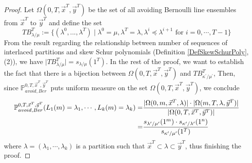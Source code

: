 \begin{proof} Let $\Omega(0,T,\vec{x}^T, \vec{y}^T)$ be the set of all avoiding Bernoulli line ensembles from $\vec{x}^T$ to $\vec{y}^T$ and define the set 
\[TB_{\lambda/\mu}^T:=\{(\lambda^0,...,\lambda^T)\mid \lambda^0=\mu, \lambda^T=\lambda, \lambda^i\preceq\lambda^{i+1}\text{ for }i=0,\cdots,T-1\}\] 
From the result regarding the relationship between number of sequences of interlaced partitions and skew Schur polynomials (Definition \ref{DefSkewSchurPoly}, (2)), we have $\lvert TB_{\lambda/\mu}^T\rvert =s_{\lambda/\mu}(1^T)$. In the rest of the proof, we want to establish the fact that there is a bijection between $\Omega(0,T,\vec{x}^{T},\vec{y}^{T})$ and $TB_{\kappa^{\prime}/\mu^{\prime}}^{T}$, Then, since $\mathbb{P}_{avoid, Ber}^{0,T,\vec{x}^{T},\vec{y}^{T}}$ puts uniform measure on the set $\Omega(0,T,\vec{x}^{T},\vec{y}^{T})$, we conclude
\begin{align*}
\mathbb{P}_{avoid,Ber}^{0,T,\vec{x}^{T},\vec{y}^{T}}(L_1(m)=\lambda_1,\cdots, L_k(m)=\lambda_k)
=&\frac{\lvert \Omega(0, m, \vec{x}^T, \lambda)\rvert\cdot \lvert \Omega(m, T, \lambda, \vec{y}^T)\rvert}{\lvert \Omega(0, T, \vec{x}^T, \vec{y}^T)\rvert}\\
=&\frac{s_{\lambda^{\prime}/\mu^{\prime}}(1^{m})\cdot s_{\kappa^{\prime}/\lambda^{\prime}}(1^{n})}{s_{\kappa^{\prime}/\mu^{\prime}}(1^T)}
\end{align*} where $\lambda=(\lambda_{1},\cdots,\lambda_{k})$ is a partition such that $\vec{x}^{T}\subset\lambda\subset\vec{y}^{T}$, thus finishing the proof.


\end{proof}
